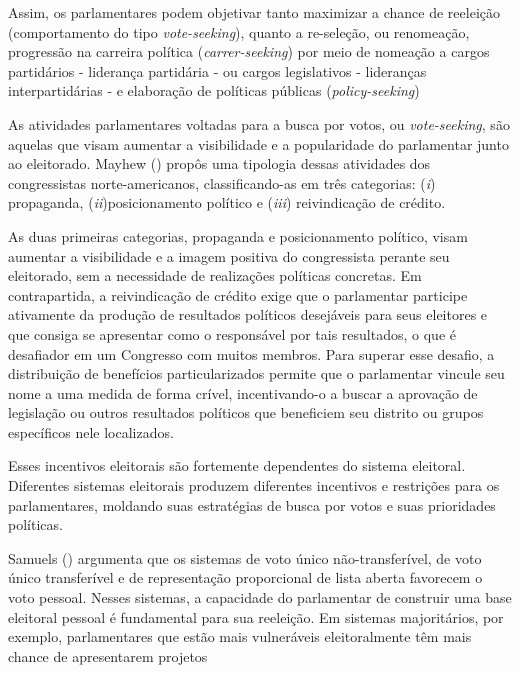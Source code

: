Assim, os parlamentares podem objetivar tanto maximizar a chance de reeleição (comportamento do tipo \textit{vote-seeking}), quanto a re-seleção, ou renomeação, progressão na carreira política (\textit{carrer-seeking}) por meio de nomeação a cargos partidários - liderança partidária - ou cargos legislativos - lideranças interpartidárias - \cite{strom1997rules} e elaboração de políticas públicas (\textit{policy-seeking}) \cite{muller1999}

As atividades parlamentares voltadas para a busca por votos, ou \textit{vote-seeking}, são aquelas que visam aumentar a visibilidade e a popularidade do parlamentar junto ao eleitorado. Mayhew (\citeyear{mayhew2004congress}) propôs uma tipologia dessas atividades dos congressistas norte-americanos, classificando-as em três categorias: (\textit{i}) propaganda, (\textit{ii})posicionamento político e (\textit{iii}) reivindicação de crédito. 

As duas primeiras categorias, propaganda e posicionamento político, visam aumentar a visibilidade e a imagem positiva do congressista perante seu eleitorado, sem a necessidade de realizações políticas concretas. Em contrapartida, a reivindicação de crédito exige que o parlamentar participe ativamente da produção de resultados políticos desejáveis para seus eleitores e que consiga se apresentar como o responsável por tais resultados, o que é desafiador em um Congresso com muitos membros. Para superar esse desafio, a distribuição de benefícios particularizados permite que o parlamentar vincule seu nome a uma medida de forma crível, incentivando-o a buscar a aprovação de legislação ou outros resultados políticos que beneficiem seu distrito ou grupos específicos nele localizados.

Esses incentivos eleitorais são fortemente dependentes do sistema eleitoral. Diferentes sistemas eleitorais produzem diferentes incentivos e restrições para os parlamentares, moldando suas estratégias de busca por votos e suas prioridades políticas. 

Samuels (\citeyear{samuels1997determinantes}) argumenta que os sistemas de voto único não-transferível, de voto único transferível e de representação proporcional de lista aberta favorecem o voto pessoal. Nesses sistemas, a capacidade do parlamentar de construir uma base eleitoral pessoal é fundamental para sua reeleição. Em sistemas majoritários, por exemplo, parlamentares que estão mais vulneráveis eleitoralmente têm mais chance de apresentarem projetos \cite{bowler2010private}

